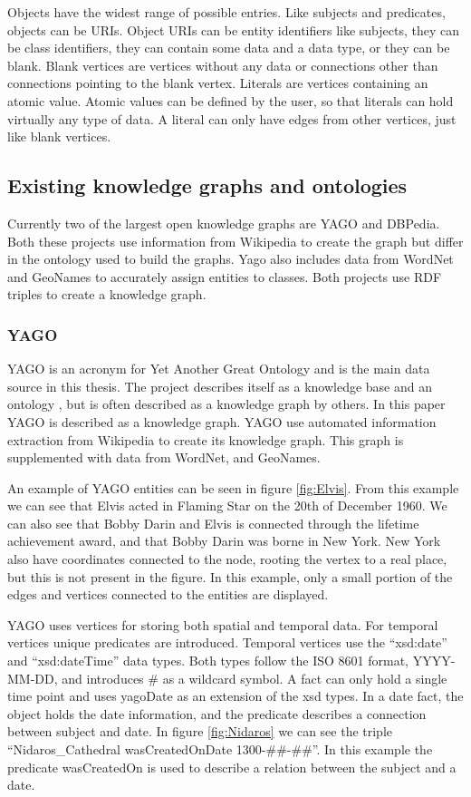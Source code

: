 Objects have the widest range of possible entries. Like subjects and predicates, objects can be URIs. Object URIs can be entity identifiers like subjects, they can be class identifiers, they can contain some data and a data type, or they can be blank. Blank vertices are vertices without any data or connections other than connections pointing to the blank vertex. Literals are vertices containing an atomic value. Atomic values can be defined by the user, so that literals can hold virtually any type of data. A literal can only have edges from other vertices, just like blank vertices.

\subsection{Existing knowledge graphs and ontologies}
Currently two of the largest open knowledge graphs are YAGO and DBPedia. Both these projects use information from Wikipedia to create the graph but differ in the ontology used to build the graphs. Yago also includes data from WordNet and GeoNames to accurately assign entities to classes. Both projects use RDF triples to create a knowledge graph.

\subsubsection{YAGO}
YAGO is an acronym for Yet Another Great Ontology and is the main data source in this thesis. The project describes itself as a knowledge base\citep{yago} and an ontology \citep{mahdisoltani:hal-01699874}, but is often described as a knowledge graph by others. In this paper YAGO is described as a knowledge graph. YAGO use automated information extraction from Wikipedia to create its knowledge graph. This graph is supplemented with data from WordNet, and GeoNames.

An example of YAGO entities can be seen in figure \ref{fig:Elvis}. From this example we can see that Elvis acted in Flaming Star on the 20th of December 1960. We can also see that Bobby Darin and Elvis is connected through the lifetime achievement award, and that Bobby Darin was borne in New York. New York also have coordinates connected to the node, rooting the vertex to a real place, but this is not present in the figure. In this example, only a small portion of the edges and vertices connected to the entities are displayed.

YAGO uses vertices for storing both spatial and temporal data. For temporal vertices unique predicates\citep{yago} are introduced. Temporal vertices use the ``xsd:date'' and ``xsd:dateTime'' data types. Both types follow the ISO 8601 format, YYYY-MM-DD, and introduces \# as a wildcard symbol. A fact can only hold a single time point and uses yagoDate as an extension of the xsd types\citep{yago}. In a date fact, the object holds the date information, and the predicate describes a connection between subject and date. In figure \ref{fig:Nidaros} we can see the triple ``Nidaros\_Cathedral wasCreatedOnDate 1300-\#\#-\#\#''. In this example the predicate wasCreatedOn is used to describe a relation between the subject and a date.

